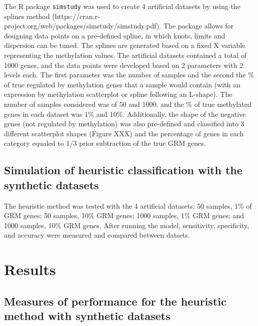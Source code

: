 \documentclass[10pt,letterpaper]{article}
\begin{document}
The R package \texttt{simstudy} was used to create 4 artificial datasets
by using the splines method
(https://cran.r-project.org/web/packages/simstudy/simstudy.pdf). The
package allows for designing data points on a pre-defined spline, in
which knots, limits and dispersion can be tuned. The splines are
generated based on a fixed X variable representing the methylation
values. The artificial datasets contained a total of 1000 genes, and the
data points were developed based on 2 parameters with 2 levels each. The
first parameter was the number of samples and the second the \% of true
regulated by methylation genes that a sample would contain (with an
expression by methylation scatterplot or spline following an L-shape).
The number of samples considered was of 50 and 1000, and the \% of true
methylated genes in each dataset was 1\% and 10\%. Additionally, the
shape of the negative genes (not regulated by methylation) was also
pre-defined and classified into 3 different scatterplot shapes (Figure
XXX) and the percentage of genes in each category equaled to 1/3 prior
subtraction of the true GRM genes.

\hypertarget{simulation-of-heuristic-classification-with-the-synthetic-datasets}{%
\subsection{Simulation of heuristic classification with the synthetic
datasets}\label{simulation-of-heuristic-classification-with-the-synthetic-datasets}}

The heuristic method was tested with the 4 artificial datasets: 50
samples, 1\% of GRM genes; 50 samples, 10\% GRM genes; 1000 samples, 1\%
GRM genes; and 1000 samples, 10\% GRM genes. After running the model,
sensitivity, specificity, and accuracy were measured and compared
between datsets.

\hypertarget{results}{%
\section{Results}\label{results}}

\hypertarget{measures-of-performance-for-the-heuristic-method-with-synthetic-datasets}{%
\subsection{Measures of performance for the heuristic method with
synthetic
datasets}\label{measures-of-performance-for-the-heuristic-method-with-synthetic-datasets}}
\end{document}
